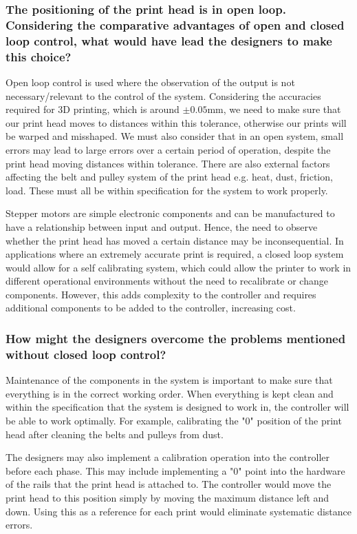 \subsubsection*{The positioning of the print head is in open loop. Considering the comparative advantages of open and closed loop control, what would have lead the designers to make this choice?}
Open loop control is used where the observation of the output is not necessary/relevant to the control of the system. Considering the accuracies required for 3D printing, which is around $\pm 0.05 \si{\milli\m}$, we need to make sure that our print head moves to distances within this tolerance, otherwise our prints will be warped and misshaped. We must also consider that in an open system, small errors may lead to large errors over a certain period of operation, despite the print head moving distances within tolerance. There are also external factors affecting the belt and pulley system of the print head e.g. heat, dust, friction, load. These must all be within specification for the system to work properly.

Stepper motors are simple electronic components and can be manufactured to have a relationship between input and output. Hence, the need to observe whether the print head has moved a certain distance may be inconsequential. In applications where an extremely accurate print is required, a closed loop system would allow for a self calibrating system, which could allow the printer to work in different operational environments without the need to recalibrate or change components. However, this adds complexity to the controller and requires additional components to be added to the controller, increasing cost.
\subsubsection*{How might the designers overcome the problems mentioned without closed loop control?}
Maintenance of the components in the system is important to make sure that everything is in the correct working order. When everything is kept clean and within the specification that the system is designed to work in, the controller will be able to work optimally. For example, calibrating the "0" position of the print head after cleaning the belts and pulleys from dust.

The designers may also implement a calibration operation into the controller before each phase. This may include implementing a "0" point into the hardware of the rails that the print head is attached to. The controller would move the print head to this position simply by moving the maximum distance left and down. Using this as a reference for each print would eliminate systematic distance errors.

